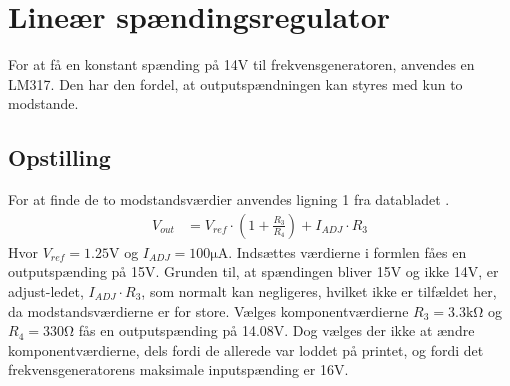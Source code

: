 \section{Lineær spændingsregulator}\label{sec:lm317}
For at få en konstant spænding på 14\si{\volt} til frekvensgeneratoren, anvendes en LM317. Den har den fordel, at outputspændningen kan styres med kun to modstande.
\subsection{Opstilling}
For at finde de to modstandsværdier anvendes ligning 1 fra databladet \cite[Side. 10]{LM317}.
\begin{align}
	V_{out} & = V_{ref} \cdot \left( 1 + \frac{R_3}{R_4} \right) + I_{ADJ} \cdot R_3 \label{eq:lm317_formel}
\end{align}
Hvor $V_{ref} = 1.25\si{\volt}$ og $I_{ADJ} = 100\si{\micro\ampere}$. Indsættes værdierne i formlen fåes en outputspænding på 15\si{\volt}. Grunden til, at spændingen bliver 15\si{\volt} og ikke 14\si{\volt}, er adjust-ledet, $I_{ADJ} \cdot R_3$, som normalt kan negligeres, hvilket ikke er tilfældet her, da modstandsværdierne er for store. Vælges komponentværdierne $R_3 = 3.3\si{\kilo\ohm}$ og $R_4 = 330\si{\ohm}$ fås en outputspænding på 14.08\si{\volt}. Dog vælges der ikke at ændre komponentværdierne, dels fordi de allerede var loddet på printet, og fordi det frekvensgeneratorens maksimale inputspænding er 16\si{\volt}.